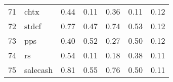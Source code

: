\documentclass[12pt]{article}
\begin{document}
\begin{footnotesize}
\begin{longtable}{rl|c|c|c|c|c}
				71                   & chtx                        & 0.44                             & 0.11                                                                                          & 0.36                                                                                          & 0.11                                                                                          & 0.12                                                                                                   \\
				72                   & stdcf                       & 0.77                             & 0.47                                                                                          & 0.74                                                                                          & 0.53                                                                                          & 0.12                                                                                                   \\
				73                   & pps                         & 0.40                             & 0.52                                                                                          & 0.27                                                                                          & 0.50                                                                                          & 0.12                                                                                                   \\
				74                   & rs                          & 0.54                             & 0.11                                                                                          & 0.18                                                                                          & 0.38                                                                                          & 0.11                                                                                                   \\
				75                   & salecash                    & 0.81                             & 0.55                                                                                          & 0.76                                                                                          & 0.50                                                                                          & 0.11                                                                                                   \\

\end{longtable}
\end{footnotesize}
\end{document}
